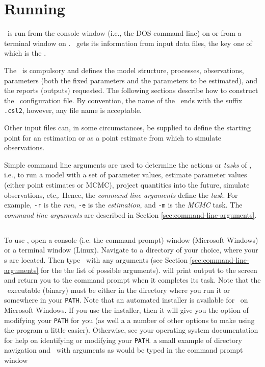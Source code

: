 \section{Running \CNAME\label{sec:running-sam}}
\CH
\CNAME\ is run from the console window (i.e., the DOS command line) on  or from a terminal window on . \CNAME\ gets its information from input data files, the key one of which is the \config{}. 

The \config\ is compulsory and defines the model structure, processes, observations, parameters (both the fixed parameters and the parameters to be estimated), and the reports (outputs) requested. The following sections  describe how to construct the \CNAME\ configuration file. By convention, the name of the \config\ ends with the suffix \texttt{.csl2}, however, any file name is acceptable.

Other input files can, in some circumstances, be supplied to define the starting point for an estimation or as a point estimate from which to simulate observations.

Simple command line arguments are used to determine the actions or \emph{tasks} of \CNAME, i.e., to run a model with a set of parameter values, estimate parameter values (either point estimates or MCMC), project quantities into the future, simulate observations, etc,. Hence, the \emph{command line arguments} define the \emph{task}. For example, \texttt{-r} is the \emph{run}, \texttt{-e} is the \emph{estimation}, and \texttt{-m} is the \emph{MCMC} task. The \emph{command line arguments} are described in Section \ref{sec:command-line-arguments}.

\subsection{}
\CH
To use \CNAME, open a console (i.e. the command prompt) window (Microsoft Windows) or a terminal window (Linux). Navigate to a directory of your choice, where your \config s are located. Then type \cname\ with any arguments (see Section \ref{sec:command-line-arguments} for the the list of possible arguments). \CNAME will print output to the screen and return you to the command prompt when it completes its task. Note that the \CNAME\ executable (binary) must be either in the directory where you run it or somewhere in your \texttt{PATH}. Note that an automated installer is available for \CNAME\ on Microsoft Windows. If you use the installer, then it will give you the option of modifying your \texttt{PATH} for you (as well a a number of other options to make using the program a little easier). Otherwise, see your operating system documentation for help on identifying or modifying your \texttt{PATH}.
\EX a small example of directory navigation and \cname\ with arguments as would be typed in the command prompt window  \EXend

